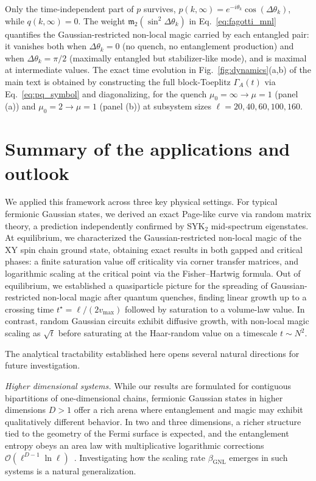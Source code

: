 \documentclass[aps,prl,twocolumn,superscriptaddress,reprint,longbibliography,nofootinbib]{revtex4-2}
\begin{document}
Only the time-independent part of $p$ survives, $p(k,\infty) = e^{-i\theta_k}\cos(\Delta\theta_k)$, while $q(k,\infty) = 0$.
The weight $\mathfrak{m}_2(\sin^2\Delta\theta_k)$ in Eq.~\eqref{eq:fagotti_mnl} quantifies the Gaussian-restricted non-local magic carried by each entangled pair: it vanishes both when $\Delta\theta_k = 0$ (no quench, no entanglement production) and when $\Delta\theta_k = \pi/2$ (maximally entangled but stabilizer-like mode), and is maximal at intermediate values.
The exact time evolution in Fig.~\ref{fig:dynamics}(a,b) of the main text is obtained by constructing the full block-Toeplitz $\Gamma_A(t)$ via Eq.~\eqref{eq:pq_symbol} and diagonalizing, for the quench $\mu_0 = \infty \to \mu = 1$ (panel (a)) and $\mu_0 = 2 \to \mu = 1$ (panel (b)) at subsystem sizes $\ell = 20, 40, 60, 100, 160$.

\section{Summary of the applications and outlook}
\label{app:outlook}
We applied this framework across three key physical settings.
For typical fermionic Gaussian states, we derived an exact Page-like curve via random matrix theory, a prediction independently confirmed by SYK$_2$ mid-spectrum eigenstates.
At equilibrium, we characterized the Gaussian-restricted non-local magic of the XY spin chain ground state, obtaining exact results in both gapped and critical phases: a finite saturation value off criticality via corner transfer matrices, and logarithmic scaling at the critical point via the Fisher--Hartwig formula.
Out of equilibrium, we established a quasiparticle picture for the spreading of Gaussian-restricted non-local magic after quantum quenches, finding linear growth up to a crossing time $t^\star= \ell/(2v_\mathrm{max})$  followed by saturation to a volume-law value.
In contrast, random Gaussian circuits exhibit diffusive growth, with non-local magic scaling as $\sqrt{t}$ before saturating at the Haar-random value on a timescale $t\sim N^2$.

The analytical tractability established here opens several natural directions for future investigation.

\emph{Higher dimensional systems.}
While our results are formulated for contiguous bipartitions of one-dimensional chains, fermionic Gaussian states in higher dimensions $D>1$ offer a rich arena where entanglement and magic may exhibit qualitatively different behavior. In two and three dimensions, a richer structure tied to the geometry of the Fermi surface is expected, and the entanglement entropy obeys an area law with multiplicative logarithmic corrections $\mathcal{O}(\ell^{D-1}\ln\ell)$~\cite{swingle2010entanglement}. 
Investigating how the scaling rate $\beta_\mathrm{GNL}$ emerges in such systems is a natural generalization.
\end{document}
